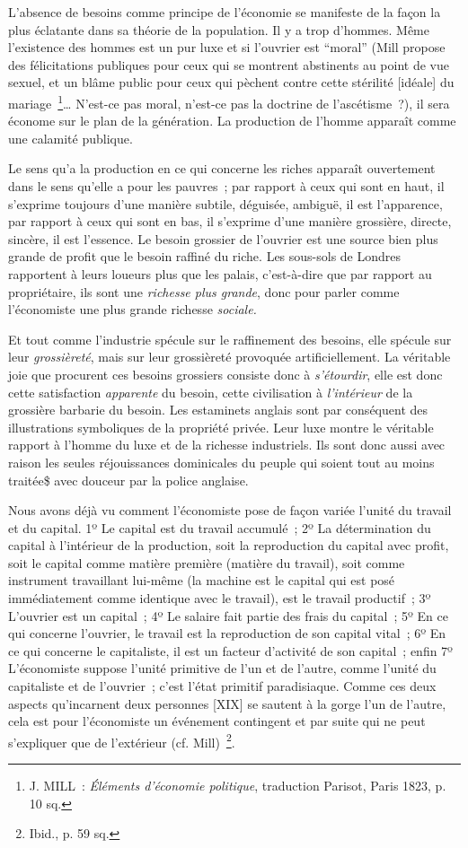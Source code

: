 \documentclass[french,twoside]{book} %
\begin{document}
L’absence de besoins comme principe de l’économie se manifeste de la façon la plus éclatante dans sa théorie de la population. Il y a trop d’hommes. Même l’existence des hommes est un pur luxe et si l’ouvrier est “moral” (Mill propose des félicitations publiques pour ceux qui se montrent abstinents au point de vue sexuel, et un blâme public pour ceux qui pèchent contre cette stérilité [idéale] du mariage \footnote{J. MILL :\emph{ Éléments d’économie politique}, traduction Parisot, Paris 1823, p. 10 sq.}… N’est-ce pas moral, n’est-ce pas la doctrine de l’ascétisme ?), il sera économe sur le plan de la génération. La production de l’homme apparaît comme une calamité publique.\par
Le sens qu’a la production en ce qui concerne les riches apparaît ouvertement dans le sens qu’elle a pour les pauvres ; par rapport à ceux qui sont en haut, il s’exprime toujours d’une manière subtile, déguisée, ambiguë, il est l’apparence, par rapport à ceux qui sont en bas, il s’exprime d’une manière grossière, directe, sincère, il est l’essence. Le besoin grossier de l’ouvrier est une source bien plus grande de profit que le besoin raffiné du riche. Les sous-sols de Londres rapportent à leurs loueurs plus que les palais, c’est-à-dire que par rapport au propriétaire, ils sont une \emph{richesse plus grande}, donc pour parler comme l’économiste une plus grande richesse \emph{sociale.}\par
Et tout comme l’industrie spécule sur le raffinement des besoins, elle spécule sur leur \emph{grossièreté}, mais sur leur grossièreté provoquée artificiellement. La véritable joie que procurent ces besoins grossiers consiste donc à \emph{s’étourdir}, elle est donc cette satisfaction \emph{apparente} du besoin, cette civilisation à \emph{l’intérieur} de la grossière barbarie du besoin. Les estaminets anglais sont par conséquent des illustrations symboliques de la propriété privée. Leur luxe montre le véritable rapport à l’homme du luxe et de la richesse industriels. Ils sont donc aussi avec raison les seules réjouissances dominicales du peuple qui soient tout au moins traitée\$ avec douceur par la police anglaise.\par
Nous avons déjà vu comment l’économiste pose de façon variée l’unité du travail et du capital. 1º Le capital est du travail accumulé ; 2º La détermination du capital à l’intérieur de la production, soit la reproduction du capital avec profit, soit le capital comme matière première (matière du travail), soit comme instrument travaillant lui-même (la machine est le capital qui est posé immédiatement comme identique avec le travail), est le travail productif ; 3º L’ouvrier est un capital ; 4º Le salaire fait partie des frais du capital ; 5º En ce qui concerne l’ouvrier, le travail est la reproduction de son capital vital ; 6º En ce qui concerne le capitaliste, il est un facteur d’activité de son capital ; enfin 7º L’économiste suppose l’unité primitive de l’un et de l’autre, comme l’unité du capitaliste et de l’ouvrier ; c’est l’état primitif paradisiaque. Comme ces deux aspects qu’incarnent deux personnes [XIX] se sautent à la gorge l’un de l’autre, cela est pour l’économiste un événement contingent et par suite qui ne peut s’expliquer que de l’extérieur (cf. Mill) \footnote{Ibid., p. 59 sq.}.\par
\end{document}
